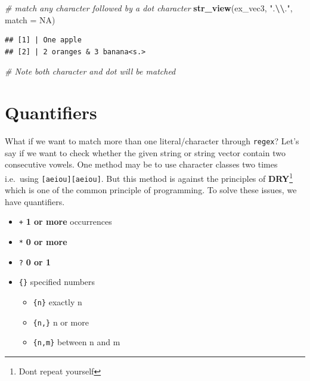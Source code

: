 \documentclass[
]{book}
\newenvironment{Shaded}{\begin{snugshade}}{\end{snugshade}}
\newcommand{\AttributeTok}[1]{\textcolor[rgb]{0.13,0.29,0.53}{#1}}
\newcommand{\CommentTok}[1]{\textcolor[rgb]{0.56,0.35,0.01}{\textit{#1}}}
\newcommand{\ConstantTok}[1]{\textcolor[rgb]{0.56,0.35,0.01}{#1}}
\newcommand{\FunctionTok}[1]{\textcolor[rgb]{0.13,0.29,0.53}{\textbf{#1}}}
\newcommand{\NormalTok}[1]{#1}
\newcommand{\SpecialCharTok}[1]{\textcolor[rgb]{0.81,0.36,0.00}{\textbf{#1}}}
\newcommand{\StringTok}[1]{\textcolor[rgb]{0.31,0.60,0.02}{#1}}
\providecommand{\tightlist}{%
  \setlength{\itemsep}{0pt}\setlength{\parskip}{0pt}}
\begin{document}
\begin{Shaded}
\begin{Highlighting}[]
\CommentTok{\# match any character followed by a dot character}
\FunctionTok{str\_view}\NormalTok{(ex\_vec3, }\StringTok{".}\SpecialCharTok{\textbackslash{}\textbackslash{}}\StringTok{."}\NormalTok{, }\AttributeTok{match =} \ConstantTok{NA}\NormalTok{)}
\end{Highlighting}
\end{Shaded}

\begin{verbatim}
## [1] | One apple
## [2] | 2 oranges & 3 banana<s.>
\end{verbatim}

\begin{Shaded}
\begin{Highlighting}[]
\CommentTok{\# Note both character and dot will be matched}
\end{Highlighting}
\end{Shaded}

\hypertarget{quantifiers}{%
\section{Quantifiers}\label{quantifiers}}

What if we want to match more than one literal/character through \texttt{regex}? Let's say if we want to check whether the given string or string vector contain two consecutive vowels. One method may be to use character classes two times i.e.~using \texttt{{[}aeiou{]}{[}aeiou{]}}. But this method is against the principles of \textbf{DRY}\footnote{Dont repeat yourself} which is one of the common principle of programming. To solve these issues, we have quantifiers.

\begin{itemize}
\tightlist
\item
  \texttt{+} \textbf{1 or more} occurrences
\item
  \texttt{*} \textbf{0 or more}
\item
  \texttt{?} \textbf{0 or 1}
\item
  \texttt{\{\}} specified numbers

  \begin{itemize}
  \tightlist
  \item
    \texttt{\{n\}} exactly n
  \item
    \texttt{\{n,\}} n or more
  \item
    \texttt{\{n,m\}} between n and m
  \end{itemize}
\end{itemize}
\end{document}
